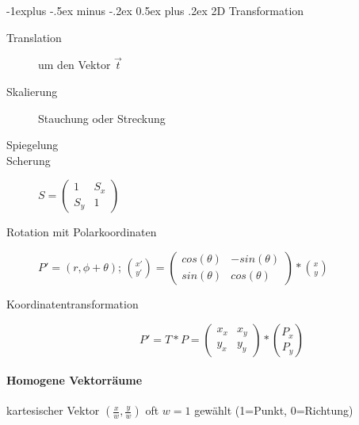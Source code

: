 \documentclass[landscape]{article}
\makeatletter
\renewcommand{\subsection}{\@startsection{subsection}{2}{0mm}%
                                {-1explus -.5ex minus -.2ex}%
                                {0.5ex plus .2ex}%
                                {\normalfont\normalsize\bfseries}}
\makeatother
\begin{document}
\begin{multicols}{3}
  \subsection{2D Transformation}
  \begin{description}
    \item[Translation] um den Vektor $\vec{t}$
    \item[Skalierung] Stauchung oder Streckung
    \item[Spiegelung]
    \item[Scherung] $S=\begin{pmatrix} 1 & S_x \\ S_y & 1 \end{pmatrix}$
    \item[Rotation mit Polarkoordinaten] $P'=(r,\phi+\theta)$; $\binom{x'}{y'}=\begin{pmatrix} cos(\theta) & -sin(\theta) \\ sin(\theta) & cos(\theta)\end{pmatrix}*\binom{x}{y}$
    \item[Koordinatentransformation] $$P' =T*P = \begin{pmatrix} x_x & x_y\\ y_x & y_y \end{pmatrix} * \binom{P_x}{P_y}$$
  \end{description}
  
  \paragraph{Homogene Vektorräume}
  kartesischer Vektor $(\frac{x}{w},\frac{y}{w})$ oft $w=1$ gewählt (1=Punkt, 0=Richtung)
  

\end{multicols}
\end{document}
